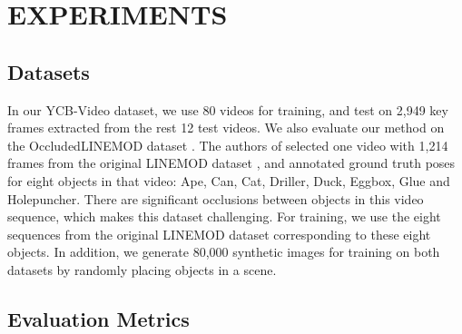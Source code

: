 \documentclass[conference]{IEEEtran}
\newcommand{\BaselineInCentimeters}{{10}}
\begin{document}

\section{EXPERIMENTS}


\subsection{Datasets}

In our YCB-Video dataset, we use 80 videos for training, and test on 2,949 key frames extracted from the rest 12 test videos. We also evaluate our method on the OccludedLINEMOD dataset \cite{krull2015learning}. The authors of \cite{krull2015learning} selected one video with 1,214 frames from the original LINEMOD dataset \cite{hinterstoisser2012model}, and annotated ground truth poses for eight objects in that video: Ape, Can, Cat, Driller, Duck, Eggbox, Glue and Holepuncher. There are significant occlusions between objects in this video sequence, which makes this dataset challenging. For training, we use the eight sequences from the original LINEMOD dataset corresponding to these eight objects. In addition, we generate 80,000 synthetic images for training on both datasets by randomly placing objects in a scene.

\subsection{Evaluation Metrics}
\end{document}
